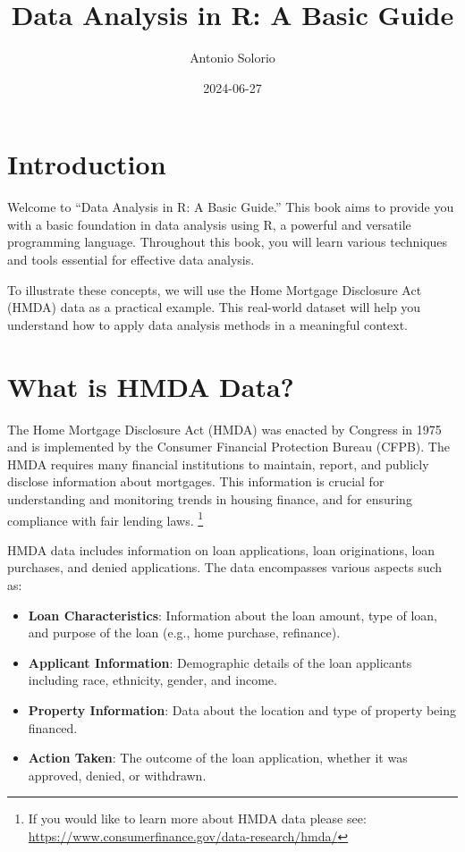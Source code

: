 \documentclass[
]{book}
\title{Data Analysis in R: A Basic Guide}
\author{Antonio Solorio}
\date{2024-06-27}
\providecommand{\tightlist}{%
  \setlength{\itemsep}{0pt}\setlength{\parskip}{0pt}}
\begin{document}
\maketitle

{
\setcounter{tocdepth}{1}
\tableofcontents
}
\hypertarget{introduction}{%
\chapter*{Introduction}\label{introduction}}

Welcome to ``Data Analysis in R: A Basic Guide.'' This book aims to provide you with a basic foundation in data analysis using R, a powerful and versatile programming language. Throughout this book, you will learn various techniques and tools essential for effective data analysis.

To illustrate these concepts, we will use the Home Mortgage Disclosure Act (HMDA) data as a practical example. This real-world dataset will help you understand how to apply data analysis methods in a meaningful context.

\hypertarget{what-is-hmda-data}{%
\chapter{What is HMDA Data?}\label{what-is-hmda-data}}

The Home Mortgage Disclosure Act (HMDA) was enacted by Congress in 1975 and is implemented by the Consumer Financial Protection Bureau (CFPB). The HMDA requires many financial institutions to maintain, report, and publicly disclose information about mortgages. This information is crucial for understanding and monitoring trends in housing finance, and for ensuring compliance with fair lending laws. \footnote{If you would like to learn more about HMDA data please see: \url{https://www.consumerfinance.gov/data-research/hmda/}}

HMDA data includes information on loan applications, loan originations, loan purchases, and denied applications. The data encompasses various aspects such as:

\begin{itemize}
\tightlist
\item
  \textbf{Loan Characteristics}: Information about the loan amount, type of loan, and purpose of the loan (e.g., home purchase, refinance).
\item
  \textbf{Applicant Information}: Demographic details of the loan applicants including race, ethnicity, gender, and income.
\item
  \textbf{Property Information}: Data about the location and type of property being financed.
\item
  \textbf{Action Taken}: The outcome of the loan application, whether it was approved, denied, or withdrawn.
\end{itemize}
\end{document}
